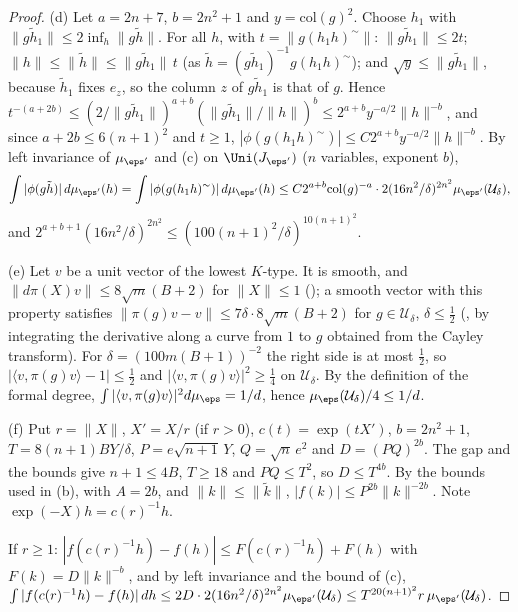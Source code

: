 \begin{proof}
(d) Let $a=2n+7$, $b=2n^2+1$ and $y=\mathrm{col}(g)^2$. Choose $h_1$ with $\|g\tilde h_1\|\le2\inf_h\|g\tilde h\|$. For all $h$, with $t=\|g(h_1h)^\sim\|$:
$\|g\tilde h_1\|\le2t$; $\|h\|\le\|\tilde h\|\le\|g\tilde h_1\|\,t$ (as $\tilde h=(g\tilde h_1)^{-1}g(h_1h)^\sim$); and $\sqrt y\le\|g\tilde h_1\|$, because $\tilde h_1$ fixes
$e_z$, so the column $z$ of $g\tilde h_1$ is that of $g$. Hence
$t^{-(a+2b)}\le(2/\|g\tilde h_1\|)^{a+b}(\|g\tilde h_1\|/\|h\|)^b\le2^{a+b}y^{-a/2}\|h\|^{-b}$, and since $a+2b\le6(n+1)^2$ and $t\ge1$,
$|\phi(g(h_1h)^\sim)|\le C2^{a+b}y^{-a/2}\|h\|^{-b}$. By left invariance of $\mu_{\eps'}$ and (c) on $\Uni(J_{\eps'})$ ($n$ variables, exponent $b$),
\[
\int|\phi(g\tilde h)|\,d\mu_{\eps'}(h)=\int|\phi(g(h_1h)^\sim)|\,d\mu_{\eps'}(h)\le C2^{a+b}\mathrm{col}(g)^{-a}\cdot2(16n^2/\delta)^{2n^2}\mu_{\eps'}(\mathcal U_\delta),
\]
and $2^{a+b+1}(16n^2/\delta)^{2n^2}\le(100(n+1)^2/\delta)^{10(n+1)^2}$.

(e) Let $v$ be a unit vector of the lowest $K$-type. It is smooth, and $\|d\pi(X)v\|\le8\sqrt m(B+2)$ for $\|X\|\le1$
(); a smooth vector with this property satisfies $\|\pi(g)v-v\|\le7\delta\cdot8\sqrt m(B+2)$ for
$g\in\mathcal U_\delta$, $\delta\le\frac12$ (, by integrating the derivative along a curve from $1$ to $g$
obtained from the Cayley transform). For $\delta=(100m(B+1))^{-2}$ the right side is at most $\frac12$, so $|\langle v,\pi(g)v\rangle-1|\le\frac12$ and
$|\langle v,\pi(g)v\rangle|^2\ge\frac14$ on $\mathcal U_\delta$. By the definition of the formal degree, $\int|\langle v,\pi(g)v\rangle|^2d\mu_\eps=1/d$, hence
$\mu_\eps(\mathcal U_\delta)/4\le1/d$.

(f) Put $r=\|X\|$, $X'=X/r$ (if $r>0$), $c(t)=\exp(tX')$, $b=2n^2+1$, $T=8(n+1)BY/\delta$, $P=e\sqrt{n+1}\,Y$, $Q=\sqrt n\,e^2$ and $D=(PQ)^{2b}$. The
gap and the bounds give $n+1\le4B$, $T\ge18$ and $PQ\le T^2$, so $D\le T^{4b}$. By the bounds used in (b), with $A=2b$, and $\|k\|\le\|\tilde k\|$,
$|f(k)|\le P^{2b}\|k\|^{-2b}$. Note $\exp(-X)h=c(r)^{-1}h$.

If $r\ge1$: $|f(c(r)^{-1}h)-f(h)|\le F(c(r)^{-1}h)+F(h)$ with $F(k)=D\|k\|^{-b}$, and by left invariance and the bound of (c),
$\int|f(c(r)^{-1}h)-f(h)|\,dh\le2D\cdot2(16n^2/\delta)^{2n^2}\mu_{\eps'}(\mathcal U_\delta)\le T^{20(n+1)^2}r\,\mu_{\eps'}(\mathcal U_\delta)$.


\end{proof}
